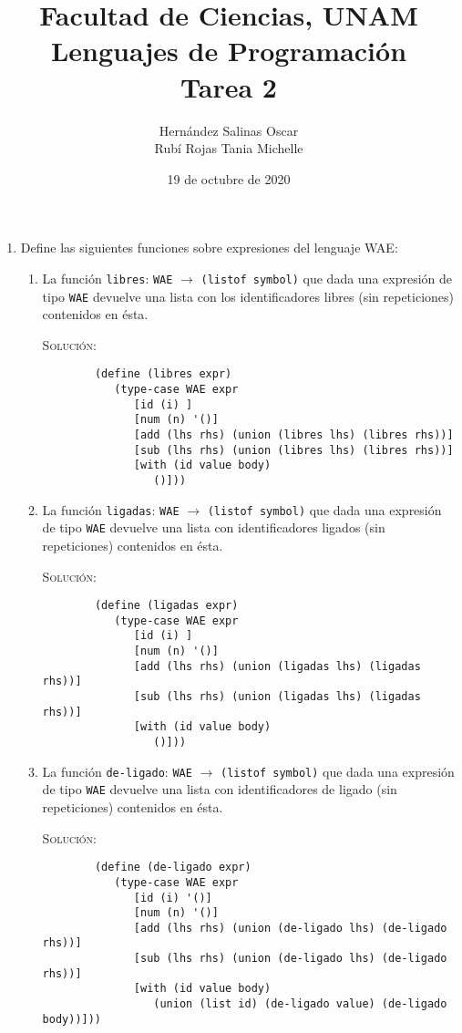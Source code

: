 \documentclass[letterpaper,11pt]{article}
\title{Facultad de Ciencias, UNAM \\ 
       Lenguajes de Programación \\ 
       Tarea 2}
\author{Hernández Salinas Oscar \\ 
        Rubí Rojas Tania Michelle }
\date{19 de octubre de 2020}
\begin{document}
\maketitle

\begin{enumerate}
    \item Define las siguientes funciones sobre expresiones del lenguaje WAE:
    \begin{enumerate}
        \item La función \texttt{libres}: \texttt{WAE} $\rightarrow$ 
        \texttt{(listof symbol)} que dada una expresión de tipo
        \texttt{WAE} devuelve una lista con los identificadores libres (sin 
        repeticiones) contenidos en ésta.

        \textsc{Solución:}
        \begin{verbatim}
        (define (libres expr) 
           (type-case WAE expr
              [id (i) ]
              [num (n) '()]
              [add (lhs rhs) (union (libres lhs) (libres rhs))]
              [sub (lhs rhs) (union (libres lhs) (libres rhs))]
              [with (id value body)
                 ()]))
        \end{verbatim}

        \item La función \texttt{ligadas}: \texttt{WAE} $\rightarrow$
        \texttt{(listof symbol)} que dada una expresión de tipo
        \texttt{WAE} devuelve una lista con identificadores ligados (sin
        repeticiones) contenidos en ésta.

        \textsc{Solución:}
        \begin{verbatim}
        (define (ligadas expr) 
           (type-case WAE expr
              [id (i) ]
              [num (n) '()]
              [add (lhs rhs) (union (ligadas lhs) (ligadas rhs))]
              [sub (lhs rhs) (union (ligadas lhs) (ligadas rhs))]
              [with (id value body)
                 ()]))
        \end{verbatim}

        \item La función \texttt{de-ligado}: \texttt{WAE} $\rightarrow$ 
        \texttt{(listof symbol)} que dada una expresión de tipo \texttt{WAE} 
        devuelve una lista con identificadores de ligado (sin repeticiones) 
        contenidos en ésta.

        \textsc{Solución:}
        \begin{verbatim}
        (define (de-ligado expr) 
           (type-case WAE expr
              [id (i) '()]
              [num (n) '()]
              [add (lhs rhs) (union (de-ligado lhs) (de-ligado rhs))]
              [sub (lhs rhs) (union (de-ligado lhs) (de-ligado rhs))]
              [with (id value body)
                 (union (list id) (de-ligado value) (de-ligado body))]))
        \end{verbatim}
    \end{enumerate} 


\end{enumerate}
\end{document}
